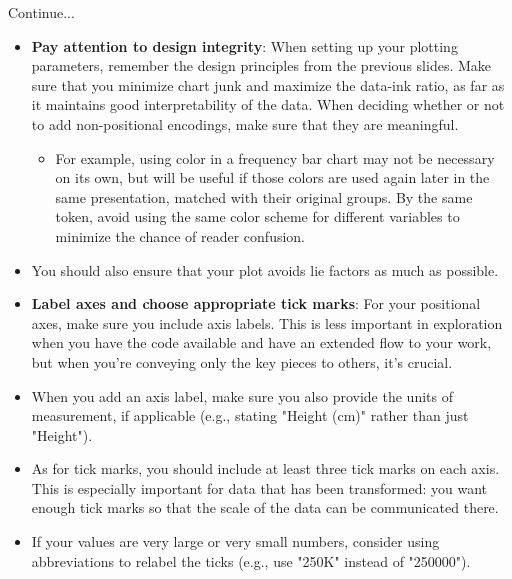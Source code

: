 \documentclass[12pt]{beamer}
\begin{document}
    \begin{frame}{Continue...}
    	\begin{itemize}
    		\item \textbf{Pay attention to design integrity}: When setting up your plotting parameters, remember the design principles from the previous slides. Make sure that you minimize chart junk and maximize the data-ink ratio, as far as it maintains good interpretability of the data. When deciding whether or not to add non-positional encodings, make sure that they are meaningful. 
    		\begin{itemize}
    		\item For example, using color in a frequency bar chart may not be necessary on its own, but will be useful if those colors are used again later in the same presentation, matched with their original groups. By the same token, avoid using the same color scheme for different variables to minimize the chance of reader confusion.
    	   \end{itemize} 
       \item You should also ensure that your plot avoids lie factors as much as possible. 
    	\end{itemize}
    \end{frame}
    \begin{frame}{}
    	\begin{itemize}
    		\item \textbf{Label axes and choose appropriate tick marks}: For your positional axes, make sure you include axis labels. This is less important in exploration when you have the code available and have an extended flow to your work, but when you're conveying only the key pieces to others, it's crucial. 
    		\item When you add an axis label, make sure you also provide the units of measurement, if applicable (e.g., stating "Height (cm)" rather than just "Height").
    		\item As for tick marks, you should include at least three tick marks on each axis. This is especially important for data that has been transformed: you want enough tick marks so that the scale of the data can be communicated there. 
    		\item If your values are very large or very small numbers, consider using abbreviations to relabel the ticks (e.g., use "250K" instead of "250000").
    	\end{itemize}
    \end{frame}
\end{document}
